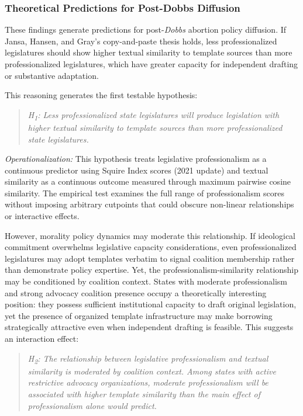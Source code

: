 \subsubsection{Theoretical Predictions for Post-Dobbs Diffusion}
These findings generate predictions for post-\emph{Dobbs} abortion policy diffusion. If Jansa, Hansen, and Gray's copy-and-paste thesis holds, less professionalized legislatures should show higher textual similarity to template sources than more professionalized legislatures, which have greater capacity for independent drafting or substantive adaptation.

This reasoning generates the first testable hypothesis:
\begin{quote}
\textit{H\textsubscript{1}: Less professionalized state legislatures will produce legislation with higher textual similarity to template sources than more professionalized state legislatures.}
\end{quote}


\emph{Operationalization:} This hypothesis treats legislative professionalism as a continuous predictor using Squire Index scores (2021 update) and textual similarity as a continuous outcome measured through maximum pairwise cosine similarity. The empirical test examines the full range of professionalism scores without imposing arbitrary cutpoints that could obscure non-linear relationships or interactive effects.

However, morality policy dynamics may moderate this relationship. If ideological commitment overwhelms legislative capacity considerations, even professionalized legislatures may adopt templates verbatim to signal coalition membership rather than demonstrate policy expertise. Yet, the professionalism-similarity relationship may be conditioned by coalition context. States with moderate professionalism and strong advocacy coalition presence occupy a theoretically interesting position: they possess sufficient institutional capacity to draft original legislation, yet the presence of organized template infrastructure may make borrowing strategically attractive even when independent drafting is feasible. This suggests an interaction effect:

\begin{quote}
\textit{H\textsubscript{2}: The relationship between legislative professionalism and textual similarity is moderated by coalition context. Among states with active restrictive advocacy organizations, moderate professionalism will be associated with higher template similarity than the main effect of professionalism alone would predict.}
\end{quote}


